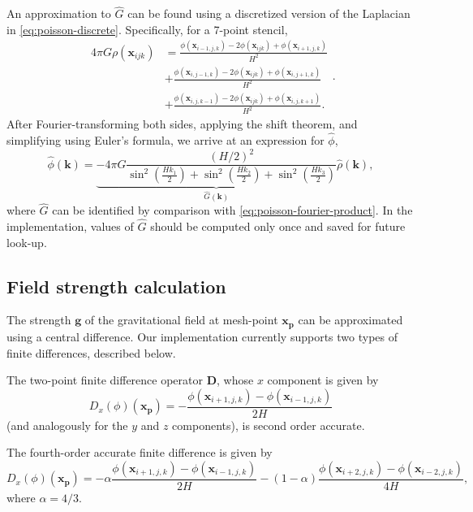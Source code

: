 An approximation to $\hat{G}$ can be found using a discretized version of the Laplacian in \autoref{eq:poisson-discrete}.
Specifically, for a 7-point stencil,
\begin{equation*}
    \begin{split}
        4\pi G\rho(\mathbf{x}_{ijk})
         & =\frac{\phi(\mathbf{x}_{i-1,j,k}) - 2\phi(\mathbf{x}_{ijk})+\phi(\mathbf{x}_{i+1,j,k})}{H^2}   \\
         & + \frac{\phi(\mathbf{x}_{i,j-1,k}) - 2\phi(\mathbf{x}_{ijk})+\phi(\mathbf{x}_{i,j+1,k})}{H^2}  \\
         & + \frac{\phi(\mathbf{x}_{i,j,k-1}) - 2\phi(\mathbf{x}_{ijk})+\phi(\mathbf{x}_{i,j,k+1})}{H^2}.
    \end{split}.
\end{equation*}
After Fourier-transforming both sides, applying the shift theorem, and simplifying using Euler's formula, we arrive at an expression for $\hat{\phi}$,
\begin{equation*}
    \hat{\phi}(\mathbf{k}) = \underbrace{-4\pi G\frac{(H/2)^2}{\sin^2\left(\frac{Hk_1}{2}\right)+\sin^2\left(\frac{Hk_2}{2}\right)+\sin^2\left(\frac{Hk_3}{2}\right)}}_{\hat{G}(\mathbf{k})} \hat{\rho}(\mathbf{k}),
\end{equation*}
where $\hat{G}$ can be identified by comparison with \autoref{eq:poisson-fourier-product}.
In the implementation, values of $\hat{G}$ should be computed only once and saved for future look-up.

\subsection{Field strength calculation}
The strength $\mathbf{g}$ of the gravitational field at mesh-point $\mathbf{x}_\mathbf{p}$ can be approximated using a central difference.
Our implementation currently supports two types of finite differences, described below.

The two-point finite difference operator $\mathbf{D}$, whose $x$ component is given by
\begin{equation}\label{eq:two-point-central-diff}
    D_x(\phi)(\mathbf{x_\mathbf{p}}) = - \frac{\phi(\mathbf{x}_{i+1,j,k}) - \phi(\mathbf{x}_{i-1,j,k})}{2H}
\end{equation}
(and analogously for the $y$ and $z$ components), is second order accurate.

The fourth-order accurate finite difference is given by
\begin{equation}\label{eq:four-point-central-diff}
    D_x(\phi)(\mathbf{x}_\mathbf{p}) = -\alpha\frac{\phi(\mathbf{x}_{i+1,j,k}) - \phi(\mathbf{x}_{i-1,j,k})}{2H} - (1-\alpha)\frac{\phi(\mathbf{x}_{i+2,j,k}) - \phi(\mathbf{x}_{i-2,j,k})}{4H},
\end{equation}
where $\alpha = 4/3$.


